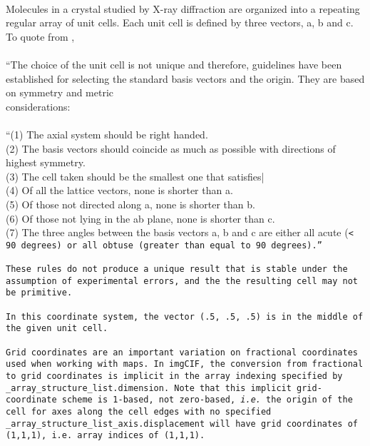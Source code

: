 \documentclass[11pt]{article}
\begin{document}
{~~\\
Molecules in a crystal studied by X-ray diffraction are organized
into a repeating regular array of unit cells.  Each unit cell is defined
by three vectors, a, b and c.  To quote from \cite{drenth2006introduction},\\
~~\\
``The choice of the unit cell is not unique and therefore, guidelines
have been established for selecting the standard basis vectors and
the origin.  They are based on symmetry and metric \\
considerations:\\
~~\\
``(1)  The axial system should be right handed.\\
(2)  The basis vectors should coincide as much as possible with
       directions of highest symmetry.\\
(3)  The cell taken should be the smallest one that satisfies|\\
(4)  Of all the lattice vectors, none is shorter than a.\\
(5)  Of those not directed along a, none is shorter than b.\\
(6)  Of those not lying in the ab plane, none is shorter than c.\\
(7)  The three angles between the basis vectors a, b and c are
either all acute (\tt{}< 90 degrees) or all obtuse (greater
than equal to 90 degrees).''\\
~~\\
These rules do not produce a unique result that is stable under
the assumption of experimental errors, and the the resulting cell
may not be primitive.\\     
~~\\     
In this coordinate system, the vector (.5, .5, .5) is in the middle
of the given unit cell.\\
~~\\     
Grid coordinates are an important variation on fractional coordinates
used when working with maps.  In imgCIF, the conversion from
fractional to grid coordinates is implicit in the array indexing
specified by \_array\_structure\_list.dimension.  Note that this
implicit grid-coordinate scheme is 1-based, not zero-based, {\it i.e.}
the origin of the cell for axes along the cell edges with no
specified \_array\_structure\_list\_axis.displacement will have
grid coordinates of (1,1,1), i.e. array indices of (1,1,1).\\
~~\\     
}
\end{document}
